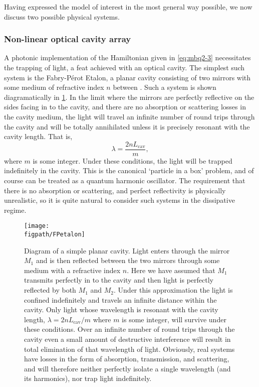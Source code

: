 Having expressed the model of interest in the most general way possible, we now discuss two possible physical systems.

\subsubsection{Non-linear optical cavity array}
A photonic implementation of the Hamiltonian given in \cref{eq:mbq2-3} necessitates the trapping of light, a feat achieved with an optical cavity. The simplest such system is the Fabry-P\'{e}rot Etalon, a planar cavity consisting of two mirrors with some medium of refractive index \(n\) between \cite{Perot1899,Fox_OC}. Such a system is shown diagramatically in \cref{fig:mbq2-1}. In the limit where the mirrors are perfectly reflective on the sides facing in to the cavity, and there are no absorption or scattering losses in the cavity medium, the light will travel an infinite number of round trips through the cavity and will be totally annihilated unless it is precisely resonant with the cavity length. That is,
\begin{equation}
	\lambda = \frac{2nL_{\mathrm{cav}}}{m},
	\label{eq:mbq2-4}
\end{equation}
where \(m\) is some integer. Under these conditions, the light will be trapped indefinitely in the cavity. This is the canonical `particle in a box' problem, and of course can be treated as a quantum harmonic oscillator. The requirement that there is no absorption or scattering, and perfect reflectivity is physically unrealistic, so it is quite natural to consider such systems in the dissipative regime.

\begin{figure}[ht!]
\centering
\texttt{[image: \\figpath/FPetalon]}
\caption{Diagram of a simple planar cavity. Light enters through the mirror \(M_{1}\) and is then reflected between the two mirrors through some medium with a refractive index \(n\). Here we have assumed that \(M_{1}\) transmits perfectly in to the cavity and then light is perfectly reflected by both \(M_{1}\) and \(M_{2}\). Under this approximation the light is confined indefinitely and travels an infinite distance within the cavity. Only light whose wavelength is resonant with the cavity length, \(\lambda = 2nL_{\mathrm{cav}} / m\) where \(m\) is some integer, will survive under these conditions. Over an infinite number of round trips through the cavity even a small amount of destructive interference will result in total elimination of that wavelength of light. Obviously, real systems have losses in the form of absorption, transmission, and scattering, and will therefore neither perfectly isolate a single wavelength (and its harmonics), nor trap light indefinitely.}
\label{fig:mbq2-1}
\end{figure}

